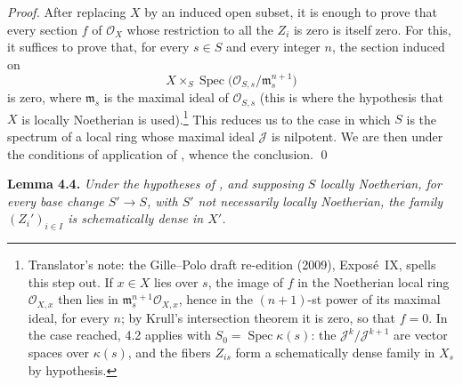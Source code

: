 \emph{Proof.}
After replacing \(X\) by an induced open subset, it is enough to prove
that every section \(f\) of \(\mathscr O_X\) whose restriction to all
the \(Z_i\) is zero is itself zero.
For this, it suffices to prove that, for every \(s\in S\) and every
integer \(n\), the section induced on
\[
  X\times_S
  \operatorname{Spec}\bigl(\mathscr O_{S,s}/\mathfrak m_s^{n+1}\bigr)
\]
is zero, where \(\mathfrak m_s\) is the maximal ideal of
\(\mathscr O_{S,s}\) (this is where the hypothesis that \(X\) is locally
Noetherian is used).\footnote{Translator's note: the Gille--Polo draft
re-edition (2009), Expos\'e~IX, spells this step out. If \(x\in X\) lies
over \(s\), the image of \(f\) in the Noetherian local ring
\(\mathscr O_{X,x}\) then lies in \(\mathfrak m_s^{n+1}\mathscr O_{X,x}\),
hence in the \((n+1)\)-st power of its maximal ideal, for every \(n\); by
Krull's intersection theorem it is zero, so that \(f=0\). In the case
reached, 4.2 applies with \(S_0=\operatorname{Spec}\kappa(s)\): the
\(\mathscr J^k/\mathscr J^{k+1}\) are vector spaces over \(\kappa(s)\), and
the fibers \(Z_{is}\) form a schematically dense family in \(X_s\) by
hypothesis.}
This reduces us to the case in which \(S\) is the spectrum of a local
ring whose maximal ideal \(\mathscr J\) is nilpotent. We are then under
the conditions of application of ,
whence the conclusion. \qed

\medskip
\noindent{}\textbf{Lemma 4.4.}
\textit{Under the hypotheses of ,
and supposing \(S\) locally Noetherian, for every base change
\(S'\to S\), with \(S'\) not necessarily locally Noetherian, the family
\((Z_i')_{i\in I}\) is schematically dense in \(X'\).}

